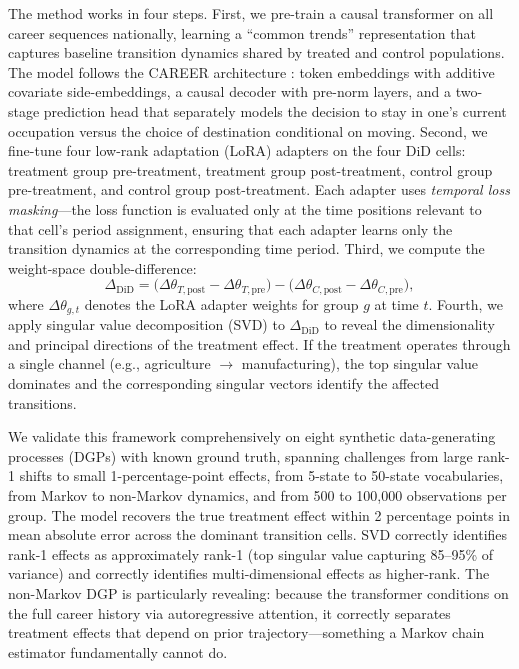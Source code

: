 \documentclass[12pt]{article}
\begin{document}
The method works in four steps. First, we pre-train a causal transformer on all career sequences nationally, learning a ``common trends'' representation that captures baseline transition dynamics shared by treated and control populations. The model follows the CAREER architecture \citep{vafa2022career}: token embeddings with additive covariate side-embeddings, a causal decoder with pre-norm layers, and a two-stage prediction head that separately models the decision to stay in one's current occupation versus the choice of destination conditional on moving. Second, we fine-tune four low-rank adaptation (LoRA) adapters \citep{hu2022lora} on the four DiD cells: treatment group pre-treatment, treatment group post-treatment, control group pre-treatment, and control group post-treatment. Each adapter uses \textit{temporal loss masking}---the loss function is evaluated only at the time positions relevant to that cell's period assignment, ensuring that each adapter learns only the transition dynamics at the corresponding time period. Third, we compute the weight-space double-difference:
\begin{equation}\label{eq:weight_did}
\Delta_{\text{DiD}} = \bigl(\Delta\theta_{T,\text{post}} - \Delta\theta_{T,\text{pre}}\bigr) - \bigl(\Delta\theta_{C,\text{post}} - \Delta\theta_{C,\text{pre}}\bigr),
\end{equation}
where $\Delta\theta_{g,t}$ denotes the LoRA adapter weights for group $g$ at time $t$. Fourth, we apply singular value decomposition (SVD) to $\Delta_{\text{DiD}}$ to reveal the dimensionality and principal directions of the treatment effect. If the treatment operates through a single channel (e.g., agriculture $\to$ manufacturing), the top singular value dominates and the corresponding singular vectors identify the affected transitions.

We validate this framework comprehensively on eight synthetic data-generating processes (DGPs) with known ground truth, spanning challenges from large rank-1 shifts to small 1-percentage-point effects, from 5-state to 50-state vocabularies, from Markov to non-Markov dynamics, and from 500 to 100,000 observations per group. The model recovers the true treatment effect within 2 percentage points in mean absolute error across the dominant transition cells. SVD correctly identifies rank-1 effects as approximately rank-1 (top singular value capturing 85--95\% of variance) and correctly identifies multi-dimensional effects as higher-rank. The non-Markov DGP is particularly revealing: because the transformer conditions on the full career history via autoregressive attention, it correctly separates treatment effects that depend on prior trajectory---something a Markov chain estimator fundamentally cannot do.
\end{document}
